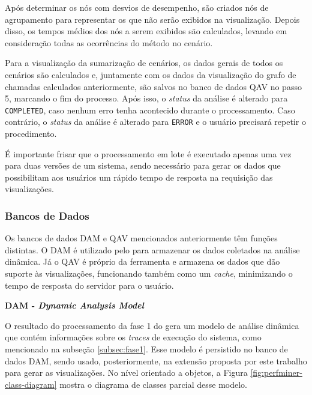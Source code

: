 Após determinar os nós com desvios de desempenho, são criados nós de agrupamento para representar os que não serão exibidos na visualização. Depois disso, os tempos médios dos nós a serem exibidos são calculados, levando em consideração todas as ocorrências do método no cenário.

Para a visualização da sumarização de cenários, os dados gerais de todos os cenários são calculados e, juntamente com os dados da visualização do grafo de chamadas calculados anteriormente, são salvos no banco de dados QAV no passo 5, marcando o fim do processo. Após isso, o \textit{status} da análise é alterado para \texttt{COMPLETED}, caso nenhum erro tenha acontecido durante o processamento. Caso contrário, o \textit{status} da análise é alterado para \texttt{ERROR} e o usuário precisará repetir o procedimento.

É importante frisar que o processamento em lote é executado apenas uma vez para duas versões de um sistema, sendo necessário para gerar os dados que possibilitam aos usuários um rápido tempo de resposta na requisição das visualizações.

\FloatBarrier

\subsubsection{Bancos de Dados} \label{subsec:databases}

Os bancos de dados DAM e QAV mencionados anteriormente têm funções distintas. O DAM é utilizado pelo \textit{\perfMinerName} para armazenar os dados coletados na análise dinâmica. Já o QAV é próprio da ferramenta \textit{\toolName} e armazena os dados que dão suporte às visualizações, funcionando também como um \textit{cache}, minimizando o tempo de resposta do servidor para o usuário.

\noindent \textbf{DAM - \textit{Dynamic Analysis Model}}

O resultado do processamento da fase 1 do \textit{\perfMinerName} gera um modelo de análise dinâmica que contém informações sobre os \textit{traces} de execução do sistema, como mencionado na subseção \ref{subsec:fase1}. Esse modelo é persistido no banco de dados DAM, sendo usado, posteriormente, na extensão proposta por este trabalho para gerar as visualizações. No nível orientado a objetos, a Figura \ref{fig:perfminer-class-diagram} mostra o diagrama de classes parcial desse modelo.

